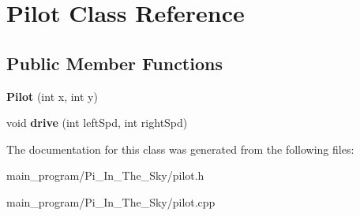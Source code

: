 \hypertarget{class_pilot}{}\section{Pilot Class Reference}
\label{class_pilot}
\subsection*{Public Member Functions}
\begin{DoxyCompactItemize}
\item 
{\bfseries Pilot} (int x, int y)\hypertarget{class_pilot_a034d4923292eeaf3ec0965519e24edbf}{}\label{class_pilot_a034d4923292eeaf3ec0965519e24edbf}

\item 
void {\bfseries drive} (int left\+Spd, int right\+Spd)\hypertarget{class_pilot_ac4b056a7c1b4a4a5798b8fb939f1c88a}{}\label{class_pilot_ac4b056a7c1b4a4a5798b8fb939f1c88a}

\end{DoxyCompactItemize}


The documentation for this class was generated from the following files\+:\begin{DoxyCompactItemize}
\item 
main\+\_\+program/\+Pi\+\_\+\+In\+\_\+\+The\+\_\+\+Sky/pilot.\+h\item 
main\+\_\+program/\+Pi\+\_\+\+In\+\_\+\+The\+\_\+\+Sky/pilot.\+cpp\end{DoxyCompactItemize}
